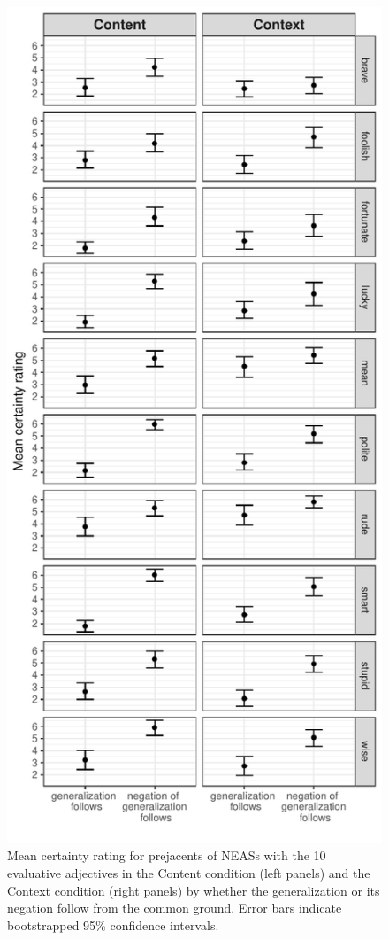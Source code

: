 \documentclass[11pt,fleqn]{article}
\newcommand{\6}{\mbox{$[\hspace*{-.6mm}[$}}
\newcommand{\9}{\mbox{$]\hspace*{-.6mm}]$}}
\begin{document}
\begin{figure}[H]
\begin{center}
\includegraphics[scale=.7]{../exp2-projection/graphs/targetmeans-by-condition-and-adj}

\caption{Mean certainty rating for prejacents of NEASs with the 10 evaluative adjectives in the Content condition (left panels) and the Context condition (right panels) by whether the generalization or its negation follow from the common ground. Error bars indicate bootstrapped 95\% confidence intervals.}\label{f-condis}
\end{center}
\end{figure}
\end{document}
